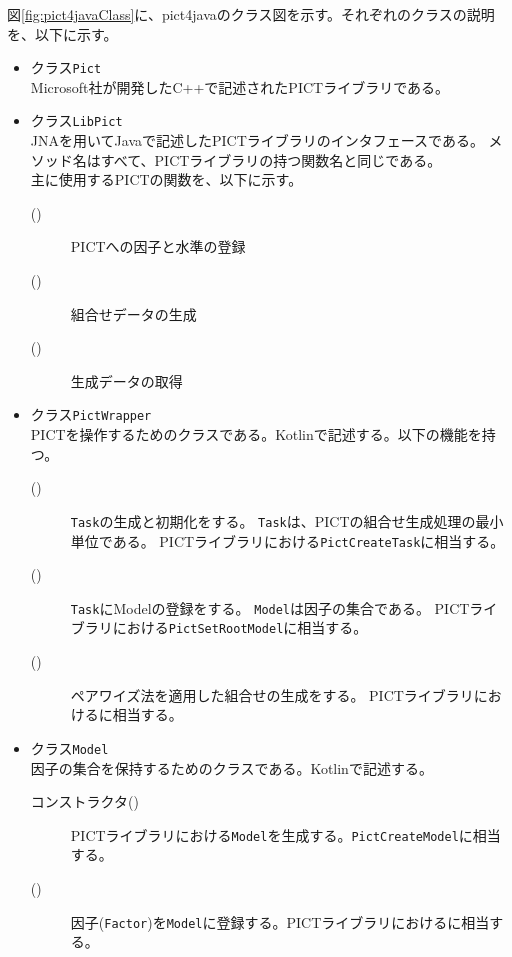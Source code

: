\documentclass[uplatex, report, a4j, 10pt]{jsbook}
\newcommand\ttt[1]{\texttt{#1}}
\begin{document}
図\ref{fig:pict4javaClass}に、pict4javaのクラス図を示す。それぞれのクラスの説明を、以下に示す。
\begin{itemize}
  \item クラス\ttt{Pict}\\
        Microsoft社が開発したC++で記述されたPICTライブラリである。
  \item クラス\ttt{LibPict}\\
        JNAを用いてJavaで記述したPICTライブラリのインタフェースである。
        メソッド名はすべて、PICTライブラリの持つ関数名と同じである。\\
        主に使用するPICTの関数を、以下に示す。
        \begin{description}
          \item[\PictAddParameter{}()] PICTへの因子と水準の登録
          \item[\PictGenerate{}()] 組合せデータの生成
          \item[\PictGetNextResultRow{}()] 生成データの取得
        \end{description}
  \item クラス\ttt{PictWrapper}\\
        PICTを操作するためのクラスである。Kotlin\cite{kotlin}で記述する。以下の機能を持つ。
        \begin{description}
          \item[\createTask{}()] \ttt{Task}の生成と初期化をする。
                \ttt{Task}は、PICTの組合せ生成処理の最小単位である。
                PICTライブラリにおける\ttt{PictCreateTask}に相当する。
          \item[\setRootModel{}()] \ttt{Task}にModelの登録をする。
                \ttt{Model}は因子の集合である。
                PICTライブラリにおける\ttt{PictSetRootModel}に相当する。
          \item[\generate{}()] ペアワイズ法を適用した組合せの生成をする。
                PICTライブラリにおける\PictGenerate{}に相当する。
        \end{description}
  \item クラス\ttt{Model}\\
        因子の集合を保持するためのクラスである。Kotlinで記述する。
        \begin{description}
          \item[コンストラクタ()] PICTライブラリにおける\ttt{Model}を生成する。\ttt{PictCreateModel}に相当する。
          \item[\addFactor{}()] 因子(\ttt{Factor})を\ttt{Model}に登録する。PICTライブラリにおける\PictAddParameter{}に相当する。

\end{description}
\end{itemize}
\end{document}
